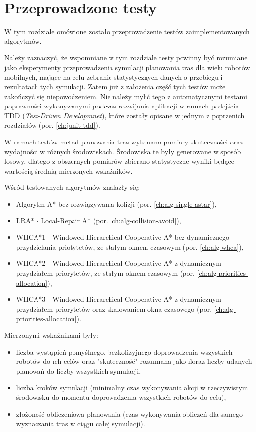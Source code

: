 \chapter{Przeprowadzone testy}
\label{ch:tests}
W tym rozdziale omówione zostało przeprowadzenie testów zaimplementowanych algorytmów.

Należy zaznaczyć, że wspomniane w tym rozdziale testy powinny być rozumiane jako eksperymenty przeprowadzenia symulacji planowania tras dla wielu robotów mobilnych, mające na celu zebranie statystycznych danych o przebiegu i rezultatach tych symulacji. Zatem już z założenia część tych testów może zakończyć się niepowodzeniem.
Nie należy mylić tego z automatycznymi testami poprawności wykonywanymi podczas rozwijania aplikacji w ramach podejścia TDD ({\it Test-Driven Developmnet}), które zostały opisane w jednym z poprzenich rozdziałów (por. \ref{ch:junit-tdd}).

W ramach testów metod planowania tras wykonano pomiary skuteczności oraz wydajności w różnych środowiskach. 
Środowiska te były generowane w sposób losowy, dlatego z obszernych pomiarów zbierano statystyczne wyniki będące wartością średnią mierzonych wskaźników.

Wśród testowanych algorytmów znalazły się:
\begin{itemize}
	\item Algorytm A* bez rozwiązywania kolizji (por. \ref{ch:alg-single-astar}),
	\item LRA* - Local-Repair A* (por. \ref{ch:alg-collision-avoid}),
	\item WHCA*1 - Windowed Hierarchical Cooperative A* bez dynamicznego przydzielania priotytetów, ze stałym oknem czasowym (por. \ref{ch:alg-whca}),
	\item WHCA*2 - Windowed Hierarchical Cooperative A* z dynamicznym przydziałem priorytetów, ze stałym oknem czasowym (por. \ref{ch:alg-priorities-allocation}),
	\item WHCA*3 - Windowed Hierarchical Cooperative A* z dynamicznym przydziałem priorytetów oraz skalowaniem okna czasowego (por. \ref{ch:alg-priorities-allocation}).
\end{itemize}

Mierzonymi wskaźnikami były:
\begin{itemize}
	\item liczba wystąpień pomyślnego, bezkolizyjnego doprowadzenia wszystkich robotów do ich celów oraz "skuteczność" rozumiana jako iloraz liczby udanych planowań do liczby wszystkich symulacji,
	\item liczba kroków symulacji (minimalny czas wykonywania akcji w rzeczywistym środowisku do momentu doprowadzenia wszystkich robotów do celu),
	\item złożoność obliczeniowa planowania (czas wykonywania obliczeń dla samego wyznaczania tras w ciągu całej symulacji).
\end{itemize}

